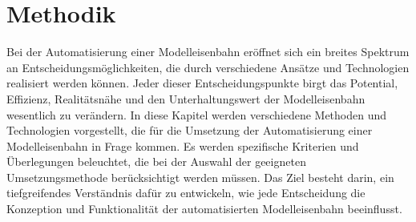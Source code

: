 \chapter{Methodik}\label{text:Methodik}

Bei der Automatisierung einer Modelleisenbahn eröffnet sich ein breites Spektrum an Entscheidungsmöglichkeiten, die durch verschiedene Ansätze und Technologien realisiert werden können. Jeder dieser Entscheidungspunkte birgt das Potential, Effizienz, Realitätsnähe und den Unterhaltungswert der Modelleisenbahn wesentlich zu verändern. In diese Kapitel werden verschiedene Methoden und Technologien vorgestellt, die für die Umsetzung der Automatisierung einer Modelleisenbahn in Frage kommen. Es werden spezifische Kriterien und Überlegungen beleuchtet, die bei der Auswahl der geeigneten Umsetzungsmethode berücksichtigt werden müssen. Das Ziel besteht darin, ein tiefgreifendes Verständnis dafür zu entwickeln, wie jede Entscheidung die Konzeption und Funktionalität der automatisierten Modelleisenbahn beeinflusst.

\newpage

\newpage

\newpage

